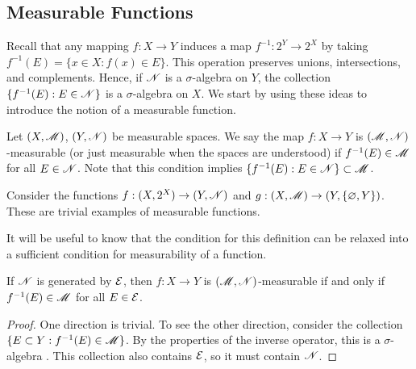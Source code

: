 \documentclass[12pt]{article} %
\begin{document}
\subsection{Measurable Functions}
Recall that any mapping $f : X \to Y$ induces a map $f^{-1} : 2^Y \to 2^X$ by taking $f^{-1}(E) = \{x \in X : f(x) \in E\}$. This operation preserves unions, intersections, and complements. Hence, if $\mathscr{N}$ is a $\sigma$-algebra on $Y$, the collection $\{f^{-1}(E) : E \in \mathscr{N}\}$ is a $\sigma$-algebra on $X$. We start by using these ideas to introduce the notion of a measurable function.

\begin{definition}
    Let $(X, \mathscr{M})$, $(Y, \mathscr{N})$ be measurable spaces. We say the map $f : X \to Y$ is $(\mathscr{M}, \mathscr{N})$-measurable (or just measurable when the spaces are understood) if $f^{-1}(E) \in \mathscr{M}$ for all $E \in \mathscr{N}$. Note that this condition implies $\{f^{-1}(E) : E \in \mathscr{N}\} \subset \mathscr{M}$.
\end{definition}

\begin{example}
    Consider the functions $f : (X, 2^X) \to (Y, \mathscr{N})$ and $g : (X, \mathscr{M}) \to (Y, \{\varnothing, Y\})$. These are trivial examples of measurable functions.
\end{example}

\noindent It will be useful to know that the condition for this definition can be relaxed into a sufficient condition for measurability of a function.

\begin{proposition}
    If $\mathscr{N}$ is generated by $\mathcal{E}$, then $f : X \to Y$ is $(\mathscr{M}, \mathscr{N})$-measurable if and only if $f^{-1}(E) \in \mathscr{M}$ for all $E \in \mathcal{E}$.
\end{proposition}

\begin{proof}
    One direction is trivial. To see the other direction, consider the collection $\{E \subset Y : f^{-1}(E) \in \mathscr{M}\}$. By the properties of the inverse operator, this is a $\sigma$-algebra . This collection also contains $\mathcal{E}$, so it must contain $\mathscr{N}$.
\end{proof}
\end{document}
